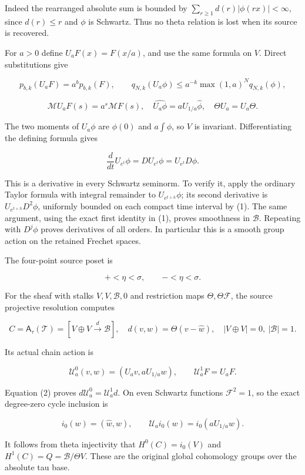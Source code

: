 \documentclass[
  11pt,
]{article}
\begin{document}
Indeed the rearranged absolute sum is bounded by
\(\sum_{r\geq1}d(r)|\phi(rx)|<\infty\), since \(d(r)\leq r\) and
\(\phi\) is Schwartz. Thus no theta relation is lost when its source is
recovered.

For \(a>0\) define \(U_aF(x)=F(x/a)\), and use the same formula on
\(V\). Direct substitutions give

\[
p_{b,k}(U_aF)=a^b p_{b,k}(F),\qquad
q_{N,k}(U_a\phi)\leq a^{-k}\max(1,a)^Nq_{N,k}(\phi),
\tag{1}
\]

\[
\mathcal MU_aF(s)=a^s\mathcal MF(s),\quad
\widehat{U_a\phi}=aU_{1/a}\widehat\phi,\quad
\Theta U_a=U_a\Theta.\tag{2}
\]

The two moments of \(U_a\phi\) are \(\phi(0)\) and \(a\int\phi\), so
\(V\) is invariant. Differentiating the defining formula gives

\[\frac{d}{dt}U_{e^t}\phi=DU_{e^t}\phi=U_{e^t}D\phi.\]

This is a derivative in every Schwartz seminorm. To verify it, apply the
ordinary Taylor formula with integral remainder to \(U_{e^{t+h}}\phi\);
its second derivative is \(U_{e^{t+h}}D^2\phi\), uniformly bounded on
each compact time interval by (1). The same argument, using the exact
first identity in (1), proves smoothness in \(\mathscr B\). Repeating
with \(D^j\phi\) proves derivatives of all orders. In particular this is
a smooth group action on the retained Frechet spaces.

The four-point source poset is

\[+<\eta<\sigma,\qquad -<\eta<\sigma.\]

For the sheaf with stalks \(V,V,\mathscr B,0\) and restriction maps
\(\Theta,\Theta\mathcal F\), the source projective resolution computes

\[
C=\mathsf A_\tau(\mathcal T)
=\left[V\oplus V\xrightarrow{d}\mathscr B\right],
\quad d(v,w)=\Theta(v-\widehat w),\quad |V\oplus V|=0,\ |\mathscr B|=1.
\tag{3}
\]

Its actual chain action is

\[
\mathcal U_a^0(v,w)=(U_av,aU_{1/a}w),\qquad
\mathcal U_a^1F=U_aF.\tag{4}
\]

Equation (2) proves \(d\mathcal U_a^0=\mathcal U_a^1d\). On even
Schwartz functions \(\mathcal F^2=1\), so the exact degree-zero cycle
inclusion is

\[i_0(w)=(\widehat w,w),\qquad
\mathcal U_ai_0(w)=i_0(aU_{1/a}w).\tag{5}\]

It follows from theta injectivity that \(H^0(C)=i_0(V)\) and
\(H^1(C)=Q=\mathscr B/\Theta V\). These are the original global
cohomology groups over the absolute tau base.
\end{document}

